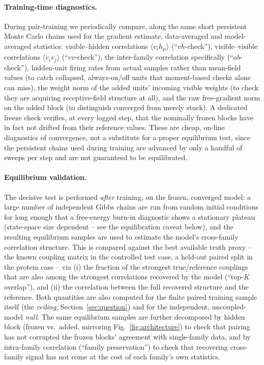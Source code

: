 \documentclass[11pt]{article}
\begin{document}
\paragraph{Training-time diagnostics.} During pair-training we
periodically compare, along the same short persistent Monte Carlo chains
used for the gradient estimate, data-averaged and model-averaged
statistics: visible--hidden correlations $\langle v_i h_\mu\rangle$
(``$vh$-check''), visible--visible correlations $\langle v_i v_j\rangle$
(``$vv$-check''), the inter-family correlation specifically (``$ab$-check''),
hidden-unit firing rates from actual samples rather than mean-field values
(to catch collapsed, always-on/off units that moment-based checks alone
can miss), the weight norm of the added units' incoming visible weights
(to check they are acquiring receptive-field structure at all), and the
raw free-gradient norm on the added block (to distinguish converged from
merely stuck). A dedicated freeze check verifies, at every logged step,
that the nominally frozen blocks have in fact not drifted from their
reference values. These are cheap, on-line diagnostics of convergence,
not a substitute for a proper equilibrium test, since the persistent
chains used during training are advanced by only a handful of sweeps per
step and are not guaranteed to be equilibrated.

\paragraph{Equilibrium validation.} The decisive test is performed
\emph{after} training, on the frozen, converged model: a large number of
independent Gibbs chains are run from random initial conditions for long
enough that a free-energy burn-in diagnostic shows a stationary plateau
(state-space size dependent -- see the equilibration caveat below), and
the resulting equilibrium samples are used to estimate the model's
cross-family correlation structure. This is compared against the best
available truth proxy -- the known coupling matrix in the controlled test
case, a held-out paired split in the protein case -- via (i) the fraction
of the strongest true/reference couplings that are also among the
strongest correlations recovered by the model (``top-$K$ overlap''), and
(ii) the correlation between the full recovered structure and the
reference. Both quantities are also computed for the finite paired
training sample itself (the \emph{ceiling}, Section~\ref{sec:question})
and for the independent, uncoupled-model \emph{null}. The same
equilibrium samples are further decomposed by hidden block (frozen vs.\
added, mirroring Fig.~\ref{fig:architecture}) to check that pairing has
not corrupted the frozen blocks' agreement with single-family data, and
by intra-family correlation (``family preservation'') to check that
recovering cross-family signal has not come at the cost of each family's
own statistics.
\end{document}

